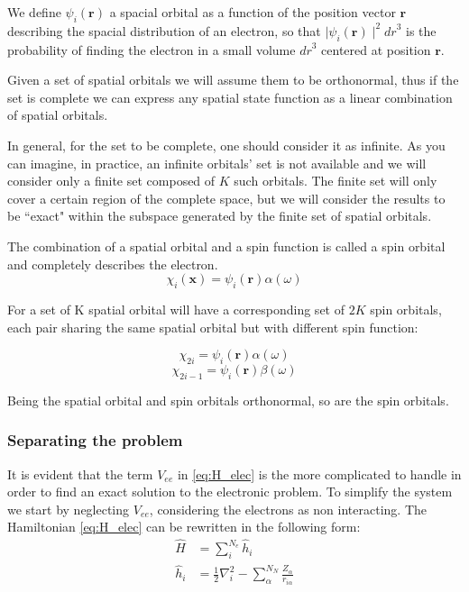 \documentclass[a4paper,12pt]{article}
\begin{document}
We define $\psi_i(\mathbf{r})$ a spacial orbital as a function of the position vector $\mathbf{r}$ describing the spacial distribution of an electron, so that $\mid\psi_i(\mathbf{r})\mid^2 {dr}^3$ is the probability of finding the electron in a small volume ${dr}^3$ centered at position $\mathbf{r}$.

Given a set of spatial orbitals we will assume them to be orthonormal, thus if the set is complete we can express any spatial state function as a linear combination of spatial orbitals.

In general, for the set to be complete, one should consider it as infinite. As you can imagine, in practice, an infinite orbitals' set is not available and we will consider only a finite set composed of $K$ such orbitals. The finite set will only cover a certain region of the complete space, but we will consider the results to be ``exact" within the subspace generated by the finite set of spatial orbitals.

The combination of a spatial orbital and a spin function is called a spin orbital and completely describes the electron. 
\begin{equation}
	\chi_{i}(\mathbf{x}) = \psi_i(\mathbf{r}) \alpha(\omega)
\end{equation}


For a set of K spatial orbital will have a corresponding set of $2K$ spin orbitals, each pair sharing the same spatial orbital but with different spin function:

\begin{equation}
	\chi_{2i} = \psi_i(\mathbf{r}) \alpha(\omega)
\end{equation}
\begin{equation}
	\chi_{2i-1} = \psi_i(\mathbf{r}) \beta(\omega)
\end{equation}

Being the spatial orbital and spin orbitals orthonormal, so are the spin orbitals.

\subsubsection{Separating the problem}

It is evident that the term $V_{ee}$ in \eqref{eq:H_elec} is the more complicated to handle in order to find an exact solution to the electronic problem.
To simplify the system we start by neglecting $V_{ee}$, considering the electrons as non interacting.
The Hamiltonian \eqref{eq:H_elec} can be rewritten in the following form:
\begin{align}
	\hat{H} & = \sum_{i}^{N_{e}} \hat{h}_{i} \label{eq:HartreeHamiltonian} 
	\\
	\hat{h}_{i} & = \frac{1}{2} \nabla_{i}^2 - \sum_{\alpha}^{N_{N}} \frac{Z_{\alpha}}{r_{i\alpha}}  \label{eq:singleElHam}
\end{align}
\end{document}
